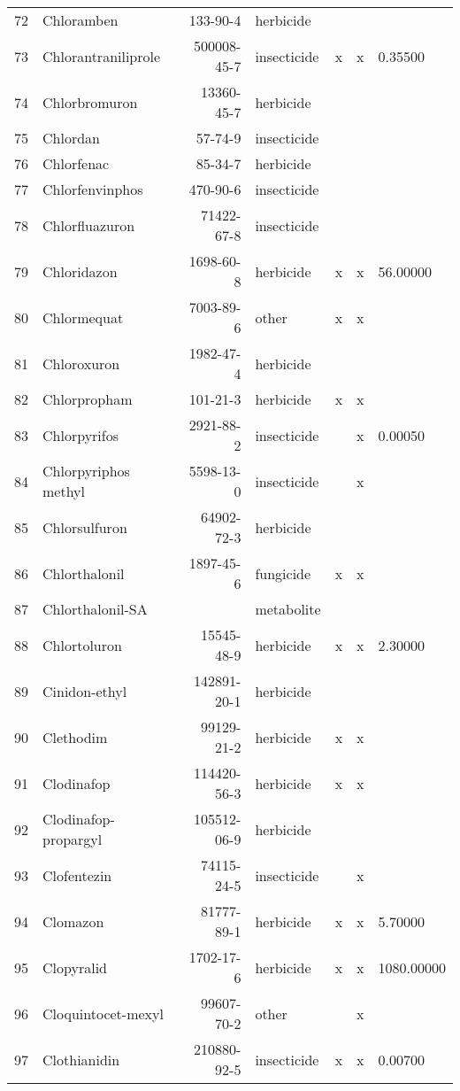 \begin{longtable}{lp{4cm}rlp{1.3cm}p{1.3cm}p{1.5cm}}
  72 & Chloramben & 133-90-4 & herbicide &  &  &  \\ 
  73 & Chlorantraniliprole & 500008-45-7 & insecticide & x & x & 0.35500 \\ 
  74 & Chlorbromuron & 13360-45-7 & herbicide &  &  &  \\ 
  75 & Chlordan & 57-74-9 & insecticide &  &  &  \\ 
  76 & Chlorfenac & 85-34-7 & herbicide &  &  &  \\ 
  77 & Chlorfenvinphos & 470-90-6 & insecticide &  &  &  \\ 
  78 & Chlorfluazuron & 71422-67-8 & insecticide &  &  &  \\ 
  79 & Chloridazon & 1698-60-8 & herbicide & x & x & 56.00000 \\ 
  80 & Chlormequat & 7003-89-6 & other & x & x &  \\ 
  81 & Chloroxuron & 1982-47-4 & herbicide &  &  &  \\ 
  82 & Chlorpropham & 101-21-3 & herbicide & x & x &  \\ 
  83 & Chlorpyrifos & 2921-88-2 & insecticide &  & x & 0.00050 \\ 
  84 & Chlorpyriphos methyl & 5598-13-0 & insecticide &  & x &  \\ 
  85 & Chlorsulfuron & 64902-72-3 & herbicide &  &  &  \\ 
  86 & Chlorthalonil & 1897-45-6 & fungicide & x & x &  \\ 
  87 & Chlorthalonil-SA &  & metabolite &  &  &  \\ 
  88 & Chlortoluron & 15545-48-9 & herbicide & x & x & 2.30000 \\ 
  89 & Cinidon-ethyl & 142891-20-1 & herbicide &  &  &  \\ 
  90 & Clethodim & 99129-21-2 & herbicide & x & x &  \\ 
  91 & Clodinafop & 114420-56-3 & herbicide & x & x &  \\ 
  92 & Clodinafop-propargyl & 105512-06-9 & herbicide &  &  &  \\ 
  93 & Clofentezin & 74115-24-5 & insecticide &  & x &  \\ 
  94 & Clomazon & 81777-89-1 & herbicide & x & x & 5.70000 \\ 
  95 & Clopyralid & 1702-17-6 & herbicide & x & x & 1080.00000 \\ 
  96 & Cloquintocet-mexyl & 99607-70-2 & other &  & x &  \\ 
  97 & Clothianidin & 210880-92-5 & insecticide & x & x & 0.00700 \\ 

\end{longtable}
